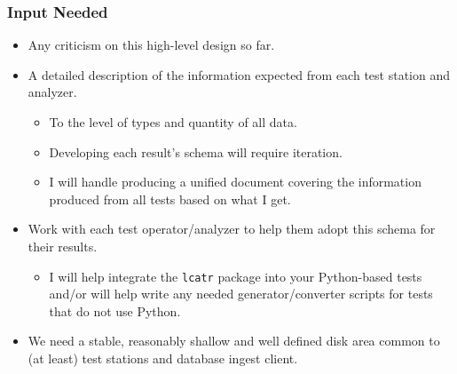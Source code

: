 \documentclass[xcolor=dvipsnames]{beamer}
\begin{document}
\begin{frame}
  \frametitle{Input Needed}
  \begin{itemize}
  \item Any criticism on this high-level design so far.
  \item A detailed description of the information expected from each
    test station and analyzer.
    \begin{itemize}
    \item To the level of types and quantity of all data.
    \item Developing each result's schema will require iteration.
    \item I will handle producing a unified document covering the
      information produced from all tests based on what I get.
    \end{itemize}
  \item Work with each test operator/analyzer to help them adopt this
    schema for their results.
    \begin{itemize}
    \item I will help integrate the \texttt{lcatr} package into your
      Python-based tests and/or will help write any needed
      generator/converter scripts for tests that do not use Python.
    \end{itemize}
  \item We need a stable, reasonably shallow and well defined disk
    area common to (at least) test stations and database ingest
    client.
  \end{itemize}
\end{frame}
\end{document}
